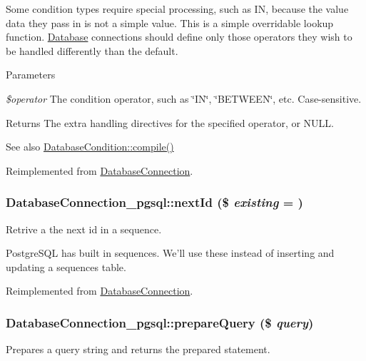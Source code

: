 Some condition types require special processing, such as IN, because the value data they pass in is not a simple value. This is a simple overridable lookup function. \hyperlink{classDatabase}{Database} connections should define only those operators they wish to be handled differently than the default.


\begin{DoxyParams}{Parameters}
\item[{\em \$operator}]The condition operator, such as \char`\"{}IN\char`\"{}, \char`\"{}BETWEEN\char`\"{}, etc. Case-\/sensitive.\end{DoxyParams}
\begin{DoxyReturn}{Returns}
The extra handling directives for the specified operator, or NULL.
\end{DoxyReturn}
\begin{DoxySeeAlso}{See also}
\hyperlink{classDatabaseCondition_a286df1af0dfaa7ab6b8b30ed4e96a830}{DatabaseCondition::compile()} 
\end{DoxySeeAlso}


Reimplemented from \hyperlink{classDatabaseConnection_aef82436b30fa08a6c81c34e11f3b1717}{DatabaseConnection}.\hypertarget{classDatabaseConnection__pgsql_a6098b360df35fec77fd8240348eb6659}{
\subsubsection[{nextId}]{\setlength{\rightskip}{0pt plus 5cm}DatabaseConnection\_\-pgsql::nextId (\$ {\em existing} = {})}}
\label{classDatabaseConnection__pgsql_a6098b360df35fec77fd8240348eb6659}
Retrive a the next id in a sequence.

PostgreSQL has built in sequences. We'll use these instead of inserting and updating a sequences table. 

Reimplemented from \hyperlink{classDatabaseConnection_a173e333ef1b61541cf37125468a37231}{DatabaseConnection}.\hypertarget{classDatabaseConnection__pgsql_aa777c52e9403cc39e355ede640a5cb4a}{
\subsubsection[{prepareQuery}]{\setlength{\rightskip}{0pt plus 5cm}DatabaseConnection\_\-pgsql::prepareQuery (\$ {\em query})}}
\label{classDatabaseConnection__pgsql_aa777c52e9403cc39e355ede640a5cb4a}
Prepares a query string and returns the prepared statement.

